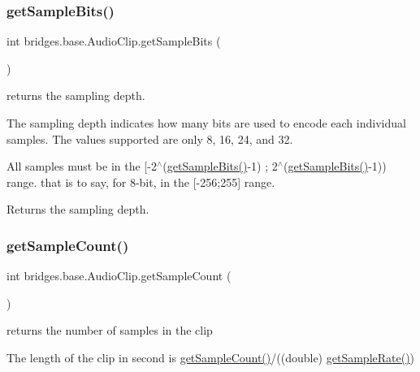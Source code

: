 \subsubsection{\texorpdfstring{get\+Sample\+Bits()}{getSampleBits()}}
{\footnotesize\ttfamily int bridges.\+base.\+Audio\+Clip.\+get\+Sample\+Bits (\begin{DoxyParamCaption}{ }\end{DoxyParamCaption})}



returns the sampling depth. 

The sampling depth indicates how many bits are used to encode each individual samples. The values supported are only 8, 16, 24, and 32.

All samples must be in the \mbox{[}-\/2$^\wedge$(\hyperlink{classbridges_1_1base_1_1_audio_clip_a59e5a3f38768e52c15e43b5679f3f09c}{get\+Sample\+Bits()}-\/1) ; 2$^\wedge$(\hyperlink{classbridges_1_1base_1_1_audio_clip_a59e5a3f38768e52c15e43b5679f3f09c}{get\+Sample\+Bits()}-\/1)) range. that is to say, for 8-\/bit, in the \mbox{[}-\/256;255\mbox{]} range.

\begin{DoxyReturn}{Returns}
the sampling depth. 
\end{DoxyReturn}
\mbox{\label{classbridges_1_1base_1_1_audio_clip_a8ad739b7a085787028b4278d65b1b3f4}} 
\subsubsection{\texorpdfstring{get\+Sample\+Count()}{getSampleCount()}}
{\footnotesize\ttfamily int bridges.\+base.\+Audio\+Clip.\+get\+Sample\+Count (\begin{DoxyParamCaption}{ }\end{DoxyParamCaption})}



returns the number of samples in the clip 

The length of the clip in second is \hyperlink{classbridges_1_1base_1_1_audio_clip_a8ad739b7a085787028b4278d65b1b3f4}{get\+Sample\+Count()}/((double) \hyperlink{classbridges_1_1base_1_1_audio_clip_a610df43929946a6186e6739e361916eb}{get\+Sample\+Rate()})

